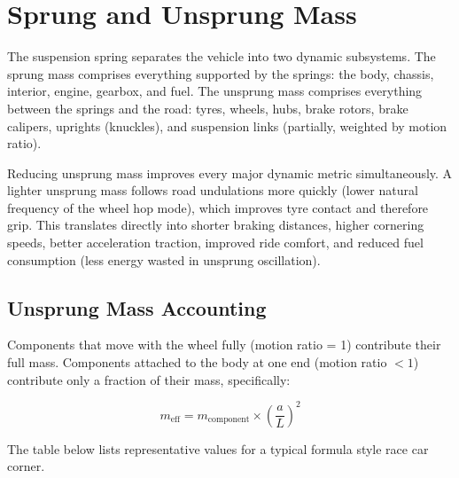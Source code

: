 \documentclass[10pt,a4paper]{article}
\begin{document}
\section{Sprung and Unsprung Mass}

The suspension spring separates the vehicle into two dynamic subsystems. The sprung mass comprises everything supported by the springs: the body, chassis, interior, engine, gearbox, and fuel. The unsprung mass comprises everything between the springs and the road: tyres, wheels, hubs, brake rotors, brake calipers, uprights (knuckles), and suspension links (partially, weighted by motion ratio).

Reducing unsprung mass improves every major dynamic metric simultaneously. A lighter unsprung mass follows road undulations more quickly (lower natural frequency of the wheel hop mode), which improves tyre contact and therefore grip. This translates directly into shorter braking distances, higher cornering speeds, better acceleration traction, improved ride comfort, and reduced fuel consumption (less energy wasted in unsprung oscillation).

\subsection{Unsprung Mass Accounting}

Components that move with the wheel fully (motion ratio = 1) contribute their full mass. Components attached to the body at one end (motion ratio $<1$) contribute only a fraction of their mass, specifically:

\begin{eqnbox}
\begin{equation}
m_{\text{eff}} = m_{\text{component}} \times \left(\frac{a}{L}\right)^2
\end{equation}
\begin{varlist}
\end{varlist}
\end{eqnbox}

The table below lists representative values for a typical formula style race car corner.
\end{document}
